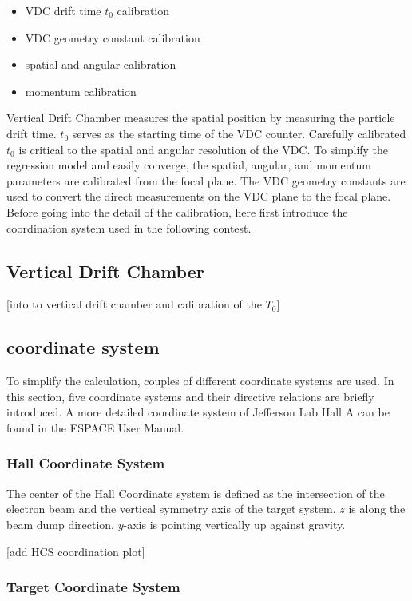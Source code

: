 \begin{itemize}
    \item VDC drift time $t_0$ calibration
    \item VDC geometry constant calibration 
    \item spatial and angular calibration
    \item momentum calibration
\end{itemize}

Vertical Drift Chamber measures the spatial position by measuring the particle drift time. $t_0$ serves as the starting time of the VDC counter. Carefully calibrated $t_0$ is critical to the spatial and angular resolution of the VDC. To simplify the regression model and easily converge, the spatial, angular, and momentum parameters are calibrated from the focal plane. The VDC geometry constants are used to convert the direct measurements on the VDC plane to the focal plane. Before going into the detail of the calibration, here first introduce the coordination system used in the following contest. 
\subsection{Vertical Drift Chamber}
[into to vertical drift chamber and calibration of the $T_0$]

\subsection{coordinate system}


To simplify the calculation, couples of different coordinate systems are used. In this section, five coordinate systems and their directive relations are briefly introduced. A more detailed coordinate system of Jefferson Lab Hall A can be found in the ESPACE User Manual\cite{espace2002manual}.  

\subsubsection{Hall Coordinate System}
The center of the Hall Coordinate system is defined as the intersection of the electron beam and the vertical symmetry axis of the target system. $z$ is along the beam dump direction. $y$-axis is pointing vertically up against gravity.

[add HCS coordination plot]

\subsubsection{Target Coordinate System}

